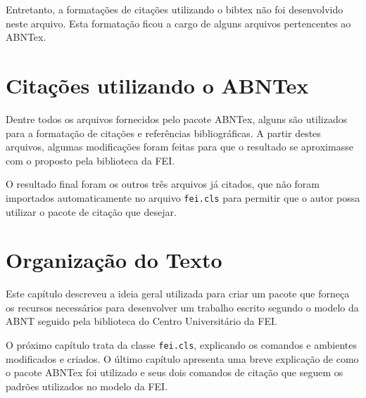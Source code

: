 Entretanto, a formatações de citações utilizando o bibtex não foi desenvolvido neste arquivo. Esta formatação ficou a cargo de alguns arquivos pertencentes ao ABNTex.

\section{Citações utilizando o ABNTex}

Dentre todos os arquivos fornecidos pelo pacote ABNTex, alguns são utilizados para a formatação de citações e referências bibliográficas. A partir destes arquivos, algumas modificações foram feitas para que o resultado se aproximasse com o proposto pela biblioteca da FEI.

O resultado final foram os outros três arquivos já citados, que não foram importados automaticamente no arquivo \texttt{fei.cls} para permitir que o autor possa utilizar o pacote de citação que desejar.

\section{Organização do Texto}

Este capítulo descreveu a ideia geral utilizada para criar um pacote que forneça os recursos necessários para desenvolver um trabalho escrito segundo o modelo da ABNT seguido pela biblioteca do Centro Universitário da FEI.

O próximo capítulo trata da classe \texttt{fei.cls}, explicando os comandos e ambientes modificados e criados. O último capítulo apresenta uma breve explicação de como o pacote ABNTex foi utilizado e seus dois comandos de citação que seguem os padrões utilizados no modelo da FEI.

